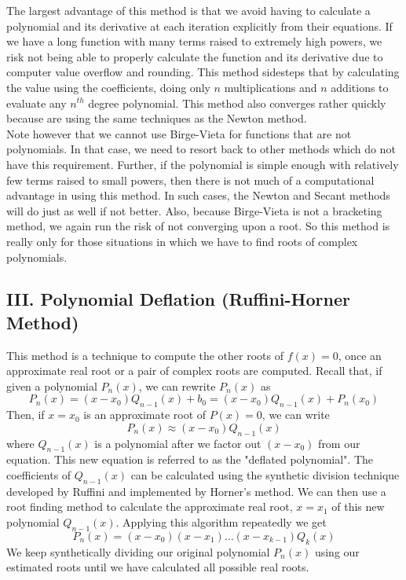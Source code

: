 \documentclass[12pt, oneside]{article}
\begin{document}
The largest advantage of this method is that we avoid having to calculate a polynomial and its derivative at each iteration explicitly from their equations. If we have a long function with many terms raised to extremely high powers, we risk not being able to properly calculate the function and its derivative due to computer value overflow and rounding. This method sidesteps that by calculating the value using the coefficients, doing only $n$ multiplications and $n$ additions to evaluate any $n^{th}$ degree polynomial. This method also converges rather quickly because are using the same techniques as the Newton method.\\
Note however that we cannot use Birge-Vieta for functions that are not polynomials. In that case, we need to resort back to other methods which do not have this requirement. Further, if the polynomial is simple enough with relatively few terms raised to small powers, then there is not much of a computational advantage in using this method. In such cases, the Newton and Secant methods will do just as well if not better. Also, because Birge-Vieta is not a bracketing method, we again run the risk of not converging upon a root. So this method is really only for those situations in which we have to find roots of complex polynomials.\\

\subsection*{III. Polynomial Deflation (Ruffini-Horner Method)}
This method is a technique to compute the other roots of $f(x) = 0$, once an approximate real root or a pair of complex roots are computed. Recall that, if given a polynomial $P_n(x)$, we can rewrite $P_n(x)$ as 
\[P_n(x) = (x-x_0)Q_{n-1}(x) + b_0 = (x-x_0)Q_{n-1}(x) + P_n(x_0)\]
Then, if $x = x_0$ is an approximate root of $P(x) = 0$, we can write 
\[P_n(x) \approx (x-x_0)Q_{n-1}(x)\]
where $Q_{n-1}(x)$ is a polynomial after we factor out $(x-x_0)$ from our equation. This new equation is referred to as the "deflated polynomial". The coefficients of $Q_{n-1}(x)$ can be calculated using the synthetic division technique developed by Ruffini and implemented by Horner's method.  We can then use a root finding method to calculate the approximate real root, $x=x_1$ of this new polynomial $Q_{n-1}(x)$.  Applying this algorithm repeatedly we get
\[P_n(x) = (x-x_0)(x-x_1)\dots (x-x_{k-1})Q_k(x)\]
We keep synthetically dividing our original polynomial $P_n(x)$ using our estimated roots until we have calculated all possible real roots.\\
\end{document}

